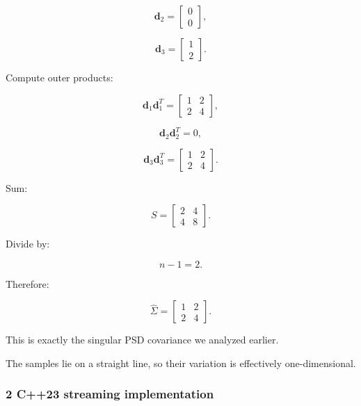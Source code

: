\[
 \mathbf d_2= \begin{bmatrix}0\\0\end{bmatrix},
\]

\[
 \mathbf d_3= \begin{bmatrix}1\\2\end{bmatrix}.
\]

Compute outer products:

\[
 \mathbf d_1\mathbf d_1^T= \begin{bmatrix}1&2\\2&4\end{bmatrix},
\]

\[
 \mathbf d_2\mathbf d_2^T=0,
\]

\[
 \mathbf d_3\mathbf d_3^T= \begin{bmatrix}1&2\\2&4\end{bmatrix}.
\]

Sum:

\[
 S= \begin{bmatrix} 2&4\\4&8 \end{bmatrix}.
\]

Divide by:

\[
 n-1=2.
\]

Therefore:

\[
 \boxed{ \widehat\Sigma= \begin{bmatrix} 1&2\\ 2&4 \end{bmatrix} }.
\]

This is exactly the singular PSD covariance we analyzed earlier.

The samples lie on a straight line, so their variation is effectively one-dimensional.

\subsubsection{2 C++23 streaming implementation}\label{02-foundations-ii-ch031-c23-streaming-implementation}

\hypertarget{02-foundations-ii-ch031-c23-streaming-implementation}{}

